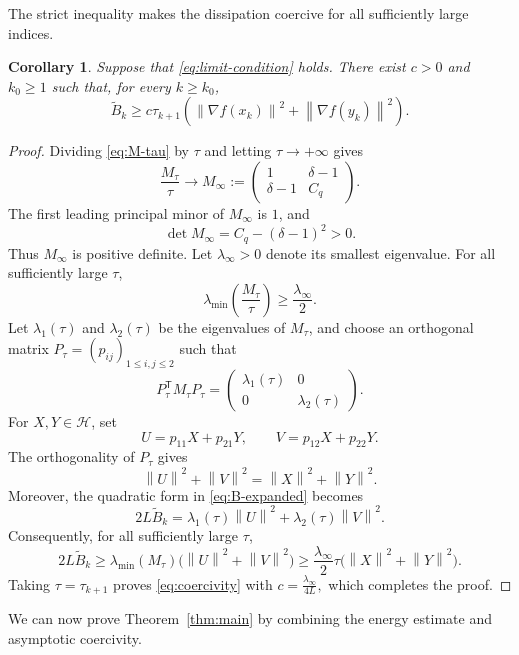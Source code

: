 \documentclass[11pt]{article}
\theoremstyle{plain}
\newtheorem{corollary}[theorem]{Corollary}
\theoremstyle{definition}
\newcommand{\Hc}{\mathcal H}
\newcommand{\norm}[1]{\left\lVert #1\right\rVert}
\begin{document}
The strict inequality makes the dissipation coercive for all sufficiently large indices.

\begin{corollary}
\label{cor:coercivity}
Suppose that \eqref{eq:limit-condition} holds. There exist $c>0$ and
$k_0\geq1$ such that, for every $k\geq k_0$,
\begin{equation}
\label{eq:coercivity}
\widetilde B_k
\geq c\tau_{k+1}
\left(\norm{\nabla f(x_k)}^2+\norm{\nabla f(y_k)}^2\right).
\end{equation}
\end{corollary}

\begin{proof}
Dividing \eqref{eq:M-tau} by $\tau$ and letting $\tau\to+\infty$ gives
$$
\frac{M_\tau}{\tau}\longrightarrow
M_\infty:=
\begin{pmatrix}
1 & \delta-1\\
\delta-1 & C_q
\end{pmatrix}.
$$The first leading principal minor of $M_\infty$ is $1$, and
$$
\det M_\infty=C_q-(\delta-1)^2>0.
$$
Thus $M_\infty$ is positive definite. Let
$\lambda_\infty>0$ denote its smallest eigenvalue. For all sufficiently
large $\tau$,
$$
\lambda_{\min}\left(\frac{M_\tau}{\tau}\right)
\geq\frac{\lambda_\infty}{2}.
$$
Let $\lambda_1(\tau)$ and $\lambda_2(\tau)$ be the eigenvalues of
$M_\tau$, and choose an orthogonal matrix
$P_\tau=(p_{ij})_{1\leq i,j\leq2}$ such that
$$
P_\tau^{\mathsf T}M_\tau P_\tau
=
\begin{pmatrix}
\lambda_1(\tau)&0\\
0&\lambda_2(\tau)
\end{pmatrix}.
$$
For $X,Y\in\Hc$, set
$$
U=p_{11}X+p_{21}Y,
\qquad
V=p_{12}X+p_{22}Y.
$$
The orthogonality of $P_\tau$ gives
$$
\norm{U}^2+\norm{V}^2
=
\norm{X}^2+\norm{Y}^2.
$$
Moreover, the quadratic form in \eqref{eq:B-expanded} becomes
$$
2L\widetilde B_k
=
\lambda_1(\tau)\norm{U}^2
+\lambda_2(\tau)\norm{V}^2.
$$
Consequently, for all sufficiently large $\tau$,
$$
2L\widetilde B_k
\geq
\lambda_{\min}(M_\tau)
\bigl(\norm{U}^2+\norm{V}^2\bigr)\geq
\frac{\lambda_\infty}{2}\tau
\bigl(\norm{X}^2+\norm{Y}^2\bigr).
$$
Taking $\tau=\tau_{k+1}$ proves \eqref{eq:coercivity} with $
c=\frac{\lambda_\infty}{4L},$ which completes the proof.
\end{proof}

We can now prove Theorem~\ref{thm:main} by combining the energy estimate and asymptotic coercivity.
\end{document}
